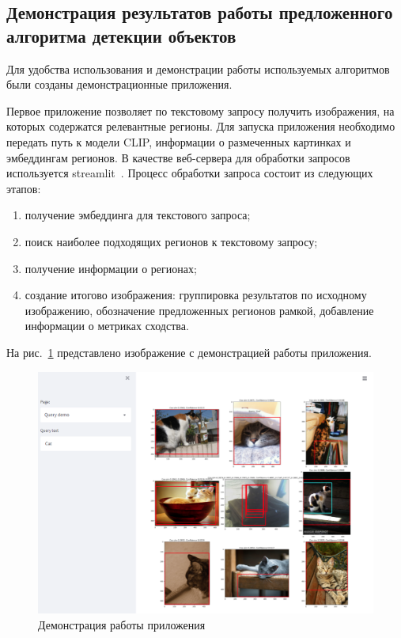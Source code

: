 \documentclass[a4paper,14pt]{article}
\begin{document}
    \subsection{Демонстрация результатов работы предложенного алгоритма детекции объектов}
    
    Для удобства использования и демонстрации работы используемых алгоритмов были созданы демонстрационные приложения.
    
    Первое приложение позволяет по текстовому запросу получить изображения, на которых содержатся релевантные регионы.
    Для запуска приложения необходимо передать путь к модели CLIP, информации о размеченных картинках и эмбеддингам регионов.
	В качестве веб-сервера для обработки запросов используется streamlit~\cite{streamlit}.
	Процесс обработки запроса состоит из следующих этапов:
	\begin{enumerate}
		[1)]
		\itemsep0em
		\item получение эмбеддинга для текстового запроса;
		\item поиск наиболее подходящих регионов к текстовому запросу;
		\item получение информации о регионах;
		\item создание итогово изображения: группировка результатов по исходному изображению,
		 обозначение предложенных регионов рамкой, 
		 добавление информации о метриках сходства.
	\end{enumerate}
	
	На рис.~\ref{fig:demo_streamlit} представлено изображение с демонстрацией работы приложения.
	
    \begin{figure}[H]
    	\centering
    	\includegraphics[width=0.7\linewidth]{images/demo_streamlit}
    	\caption{Демонстрация работы приложения}
    	\label{fig:demo_streamlit}
    \end{figure}
    
\end{document}
